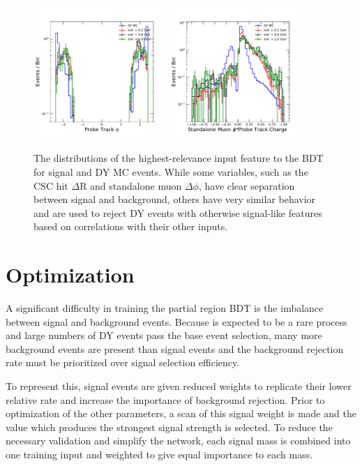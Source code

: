 \begin{figure}[htpb]
	\hspace{0.01\textwidth}
	\includegraphics[width=0.45\textwidth]{figures/bdtInputFeatseta.pdf}
	\includegraphics[width=0.45\textwidth]{figures/bdtInputFeatsstaPhi.pdf}
	\caption[Input BDT Classification Features]{The distributions of the highest-relevance input feature to the BDT for signal and DY MC events. While some variables, such as the CSC hit $\Delta$R and standalone muon $\Delta\phi$, have clear separation between signal and background, others have very similar behavior and are used to reject DY events with otherwise signal-like features based on correlations with their other inputs.}
	\label{fig:bdtFeatures}
\end{figure}

\section{Optimization}
A significant difficulty in training the partial region BDT is the imbalance between signal and background events. 
Because \dbrem is expected to be a rare process and large numbers of DY events pass the base event selection, many more background events are present than signal events and the background rejection rate must be prioritized over signal selection efficiency.

To represent this, signal events are given reduced weights to replicate their lower relative rate and increase the importance of background rejection.
Prior to optimization of the other parameters, a scan of this signal weight is made and the value which produces the strongest signal strength is selected.
To reduce the necessary validation and simplify the network, each signal mass is combined into one training input and weighted to give equal importance to each mass.


